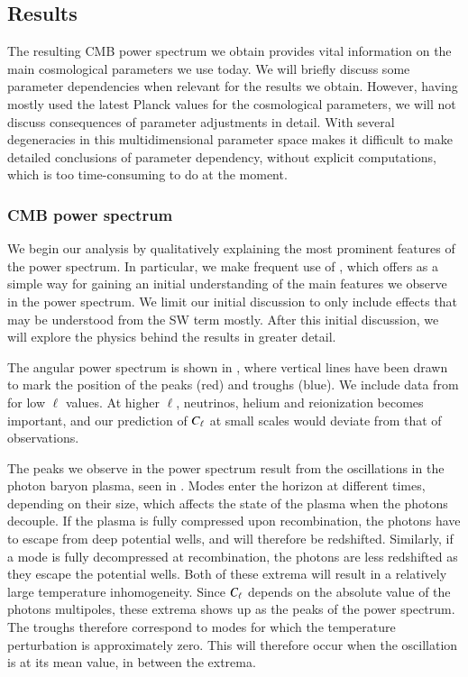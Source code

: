 \subsection{Results}\label{ssec:M4:results}
The resulting CMB power spectrum we obtain provides vital information on the main cosmological parameters we use today. We will briefly discuss some parameter dependencies when relevant for the results we obtain. However, having mostly used the latest Planck values for the cosmological parameters, we will not discuss consequences of parameter adjustments in detail. With several degeneracies in this multidimensional parameter space makes it difficult to make detailed conclusions of parameter dependency, without explicit computations, which is too time-consuming to do at the moment.  

\subsubsection{CMB power spectrum} \label{sssec:M4:results:angular_power_spectrum}
We begin our analysis by qualitatively explaining the most prominent features of the power spectrum. In particular, we make frequent use of , which offers as a simple way for gaining an initial understanding of the main features we observe in the power spectrum. We limit our initial discussion to only include effects that may be understood from the SW term mostly. After this initial discussion, we will explore the physics behind the results in greater detail.

The angular power spectrum is shown in , where vertical lines have been drawn to mark the position of the peaks (red) and troughs (blue). We include data from \cite{Planck2020} for low $\ell$ values. At higher $\ell$, neutrinos, helium and reionization becomes important, and our prediction of $C_\ell$ at small scales would deviate from that of observations. 

The peaks we observe in the power spectrum result from the oscillations in the photon baryon plasma, seen in . Modes enter the horizon at different times, depending on their size, which affects the state of the plasma when the photons decouple. If the plasma is fully compressed upon recombination, the photons have to escape from deep potential wells, and will therefore be redshifted. Similarly, if a mode is fully decompressed at recombination, the photons are less redshifted as they escape the potential wells. Both of these extrema will result in a relatively large temperature inhomogeneity. Since $C_\ell$ depends on the absolute value of the photons multipoles, these extrema shows up as the peaks of the power spectrum. The troughs therefore correspond to modes for which the temperature perturbation is approximately zero. This will therefore occur when the oscillation is at its mean value, in between the extrema.     

